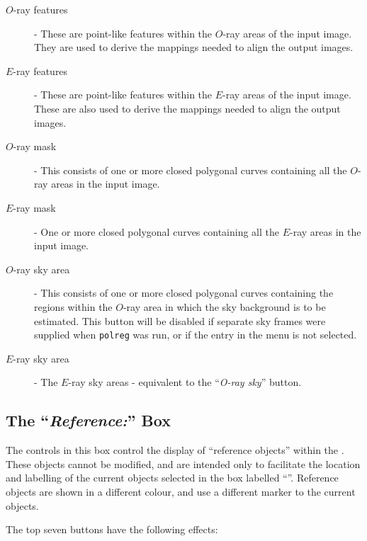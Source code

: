 \begin{description}
\item [$O$-ray features] - These are point-like features within the
$O$-ray areas of the input image. They are used to derive the mappings
needed to align the output images.
\item [$E$-ray features] - These are point-like features within the
$E$-ray areas of the input image. These are also used to derive the mappings
needed to align the output images.
\item [$O$-ray mask] - This consists of one or more closed polygonal curves
containing all the $O$-ray areas in the input image. 
\item [$E$-ray mask] - One or more closed polygonal curves
containing all the $E$-ray areas in the input image. 
\item [$O$-ray sky area] - This consists of one or more closed polygonal curves
containing the regions within the $O$-ray area in which the sky
background is to be estimated. This button will be disabled if 
separate sky frames were supplied when {\tt polreg} was run, or if the
 entry in the  menu is not selected.
\item [$E$-ray sky area] - The $E$-ray sky areas - equivalent to the ``{\em O-ray
sky}'' button.
\end{description}

\subsection {The ``{\em Reference:}'' Box}
The controls in this box control the display of ``reference objects''
within the . These
objects cannot be modified, and are intended only to facilitate the location
and labelling of the current objects selected in the box labelled 
``''. Reference objects are
shown in a different colour, and use a different marker to the current
objects.

The top seven buttons have the following effects:

